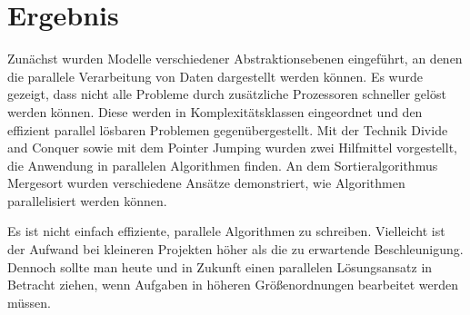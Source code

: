 \section{Ergebnis}
Zunächst wurden Modelle verschiedener Abstraktionsebenen eingeführt, an denen
die parallele Verarbeitung von Daten dargestellt werden können.
Es wurde gezeigt, dass nicht alle Probleme durch zusätzliche Prozessoren
schneller gelöst werden können.
Diese werden in Komplexitätsklassen eingeordnet und den effizient parallel
lösbaren Problemen gegenübergestellt.
Mit der Technik Divide and Conquer sowie mit dem Pointer Jumping wurden zwei
Hilfmittel vorgestellt, die Anwendung in parallelen Algorithmen finden.
An dem Sortieralgorithmus Mergesort wurden verschiedene Ansätze demonstriert,
wie Algorithmen parallelisiert werden können.

Es ist nicht einfach effiziente, parallele Algorithmen zu schreiben.
Vielleicht ist der Aufwand bei kleineren Projekten höher als die zu erwartende
Beschleunigung.
Dennoch sollte man heute und in Zukunft einen parallelen Lösungsansatz in
Betracht ziehen, wenn Aufgaben in höheren Größenordnungen bearbeitet werden
müssen.

